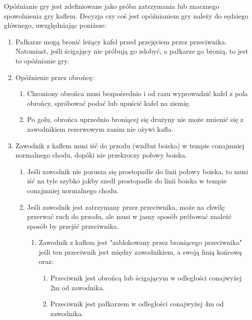 \documentclass[11pt,a4paper]{article}
\renewcommand{\subsubsection}[1]{
  \oldsubsubsection{#1}%
  \label{\thesubsubsection}
}
\begin{document}
\subsubsection{Opóźnianie gry}
Opóźnianie gry jest zdefiniowane jako próba zatrzymania lub znacznego spowolnienia gry kaflem. Decyzja czy coś jest opóźnianiem gry należy do sędziego głównego, uwzględniając poniższe:
\begin{enumerate}
  \item Pałkarze mogą bronić leżący kafel przed przejęciem przez przeciwnika. Natomiast, jeśli ścigający nie próbują go zdobyć, a pałkarze go bronią, to jest to opóźnianie gry.
  \item Opóźnienie przez obrońcę:
  \begin{enumerate}
    \item Chroniony obrońca musi bezpośrednio i od razu wyprowadzić kafel z pola obrońcy, spróbować podać lub upuścić kafel na ziemię.
    \item Po golu, obrońca uprzednio broniącej się drużyny nie może zmienić się z zawodnikiem rezerwowym zanim nie ożywi kafla.
  \end{enumerate}
  \item Zawodnik z kaflem musi iść do przodu (wzdłuż boiska) w tempie conajmniej normalnego chodu, dopóki nie przekroczy połowy boiska.
  \begin{enumerate}
    \item Jeśli zawodnik nie porusza się prostopadle do linii połowy boiska, to musi iść na tyle szybko jakby szedł prostopadle do linii boiska w tempie conajmniej normalnego chodu.
    \item Jeśli zawodnik jest zatrzymany przez przeciwnika, może na chwilę przerwać ruch do przodu, ale musi w jasny sposób próbować znaleźć sposób by przejść przeciwnika.
    \begin{enumerate}
      \item Zawodnik z kaflem jest "zablokowany przez broniącego przeciwnika" jeśli ten przeciwnik jest między zawodnikiem, a swoją linią końcową oraz:
      \begin{enumerate}
        \item Przeciwnik jest obrońcą lub ścigającym w odległości conajwyżej 2m od zawodnika.
        \item Przeciwnik jest pałkarzem w odległości conajwyżej 4m od zawodnika.
      \end{enumerate}
    \end{enumerate}
  \end{enumerate}

\end{enumerate}
\end{document}
